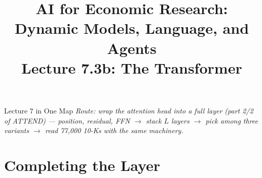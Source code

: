 



\graphicspath{{./pic/}{../../MiniCourse_8hr/Slides/Module3_LLM_Text/pic/}{../}}

\usetikzlibrary{positioning,arrows.meta,shapes,calc,matrix,fit,backgrounds}



\title[AI for Econ Research]{AI for Economic Research: Dynamic Models, Language, and Agents\\
Lecture 7.3b: The Transformer}



\makebeamertitle

\begin{frame}{Lecture 7 in One Map}
\medskip
\textit{\footnotesize Route: wrap the attention head into a full layer (part 2/2 of ATTEND) --- position, residual, FFN $\to$ stack $L$ layers $\to$ pick among three variants $\to$ read 77{,}000 10-Ks with the same machinery.}
\end{frame}

\section{Completing the Layer}

